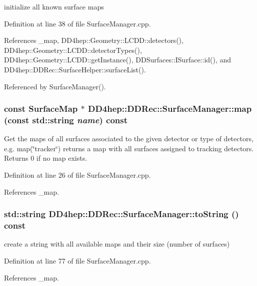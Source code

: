 initialize all known surface maps 

Definition at line 38 of file SurfaceManager.cpp.

References \_\-map, DD4hep::Geometry::LCDD::detectors(), DD4hep::Geometry::LCDD::detectorTypes(), DD4hep::Geometry::LCDD::getInstance(), DDSurfaces::ISurface::id(), and DD4hep::DDRec::SurfaceHelper::surfaceList().

Referenced by SurfaceManager().\hypertarget{class_d_d4hep_1_1_d_d_rec_1_1_surface_manager_aaa5f5c5770932ab79ba79e4e5ab29dc6}{
\subsubsection[{map}]{\setlength{\rightskip}{0pt plus 5cm}const {\bf SurfaceMap} $\ast$ DD4hep::DDRec::SurfaceManager::map (const std::string {\em name}) const}}
\label{class_d_d4hep_1_1_d_d_rec_1_1_surface_manager_aaa5f5c5770932ab79ba79e4e5ab29dc6}
Get the maps of all surfaces associated to the given detector or type of detectors, e.g. map(\char`\"{}tracker\char`\"{}) returns a map with all surfaces assigned to tracking detectors. Returns 0 if no map exists. 

Definition at line 26 of file SurfaceManager.cpp.

References \_\-map.\hypertarget{class_d_d4hep_1_1_d_d_rec_1_1_surface_manager_aea6e68f5f786d940be70884db7091ebb}{
\subsubsection[{toString}]{\setlength{\rightskip}{0pt plus 5cm}std::string DD4hep::DDRec::SurfaceManager::toString () const}}
\label{class_d_d4hep_1_1_d_d_rec_1_1_surface_manager_aea6e68f5f786d940be70884db7091ebb}


create a string with all available maps and their size (number of surfaces) 

Definition at line 77 of file SurfaceManager.cpp.

References \_\-map.

